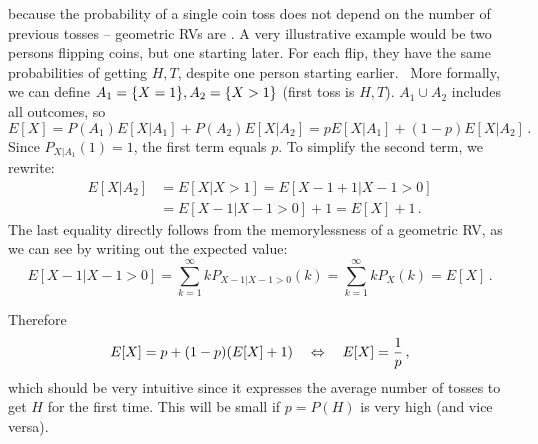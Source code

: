 \begin{ex}[Memorylessness]
because the probability of a single coin toss does not depend on the number of previous tosses -- geometric RVs are . A very illustrative example would be two persons flipping coins, but one starting later. For each flip, they have the same probabilities of getting $H, T$, despite one person starting earlier.\footnotemark%
~More formally, we can define $A_1 = \qty{X = 1}, A_2 = \qty{X > 1}$ (first toss is $H, T$). $A_1 \cup A_2$ includes all outcomes, so
\begin{equation*}
E[X] = P(A_1) E[X | A_1] + P(A_2) E[X | A_2] = p E[X | A_1] + (1 - p) E[X | A_2] \, .
\end{equation*}
Since $P_{X | A_1}(1) = 1$, the first term equals $p$. To simplify the second term, we rewrite:
\begin{align*}
E[X | A_2] &= E[X | X > 1] = E[X - 1 + 1 | X - 1 > 0]
\\
&= E[X - 1 | X - 1 > 0] + 1 = E[X] + 1 \, .
\end{align*}
The last equality directly follows from the memorylessness of a geometric RV, as we can see by writing out the expected value:
\begin{equation*}
E[X - 1 | X - 1 > 0] = \sum_{k = 1}^\infty k P_{X - 1 | X - 1 > 0}(k) = \sum_{k = 1}^\infty k P_X(k) = E[X] \, .
\end{equation*}

Therefore
\begin{equation*}
E[X] = p + (1 - p) \qty(E[X] + 1) \quad \Leftrightarrow \quad E[X] = \frac{1}{p} \, ,
\end{equation*}
which should be very intuitive since it expresses the average number of tosses to get $H$ for the first time. This will be small if $p = P(H)$ is very high (and vice versa).
\end{ex}



